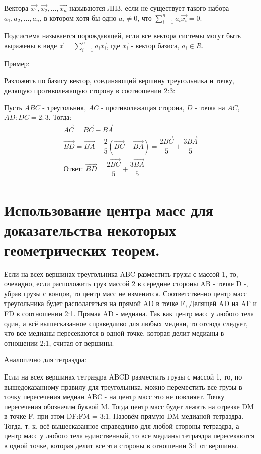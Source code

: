 \documentclass[12pt]{article}
\begin{document}
\begin{sloppypar}
    Вектора $\vec{x_1}, \vec{x_2}, ..., \vec{x_n}$ называются ЛНЗ, если не существует такого набора $a_1, a_2, ..., a_n$, в котором хотя бы одно $a_i \neq 0$, что $\sum_{i = 1}^n a_i\vec{x_i} = 0$.

    Подсистема называется порождающей, если все вектора системы могут быть выражены в виде $\vec{x} = \sum_{i = 1}^n a_i\vec{x_i}$, где $\Vec{x_i}$ - вектор базиса, $a_i \in R$.

    Пример:

    Разложить по базису вектор, соединяющий вершину треугольника и точку, делящую противолежащую сторону в соотношении 2:3:

    Пусть $ABC$ - треугольник, $AC$ - противолежащая сторона, $D$ - точка на $AC$, $AD:DC = 2:3$. Тогда:
    \[
        \begin{array}{l}
            \overrightarrow{AC} = \overrightarrow{BC} - \overrightarrow{BA}                                         \\
            \overrightarrow{BD} = \overrightarrow{BA} - \dfrac{2}{5}(\overrightarrow{BC} - \overrightarrow{BA}) =
            \dfrac{2\overrightarrow{BC}}{5} + \dfrac{3\overrightarrow{BA}}{5}                                       \\
            \text{Ответ: }  \overrightarrow{BD} = \dfrac{2\overrightarrow{BC}}{5} + \dfrac{3\overrightarrow{BA}}{5} \\
        \end{array}
    \]

    \section{Использование центра масс для доказательства некоторых геометрических теорем.}

    Если на всех вершинах треугольника ABC разместить грузы с массой 1, то, очевидно, если расположить груз массой 2 в середине стороны AB - точке D -, убрав грузы с концов, то центр масс не изменится. Соответственно центр масс треугольника будет располагаться на прямой AD в точке F, Делящей AD на AF и FD в соотношении 2:1. Прямая AD - медиана. Так как центр масс у любого тела один, а всё вышесказанное справедливо для любых медиан, то отсюда следует, что все медианы пересекаются в одной точке, которая делит медианы в отношении 2:1, считая от вершины.

    Аналогично для тетраэдра:

    Если на всех вершинах тетраэдра ABCD разместить грузы с массой 1, то, по вышедоказанному правилу для треугольника, можно переместить все грузы в точку пересечения медиан ABC - на центр масс это не повлияет. Точку пересечения обозначим буквой M. Тогда центр масс будет лежать на отрезке DM в точке F, при этом DF:FM = 3:1. Назовём прямую DM медианой тетраэдра. Тогда, т. к. всё вышесказанное справедливо для любой стороны тетраэдра, а центр масс у любого тела единственный, то все медианы тетраэдра пересекаются в одной точке, которая делит все эти стороны в отношении 3:1 от вершины.


\end{sloppypar}
\end{document}
